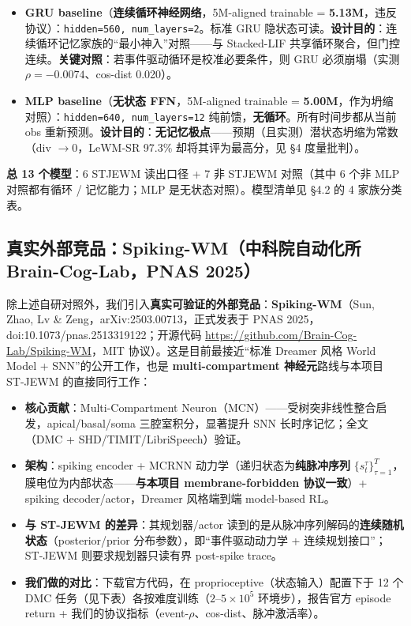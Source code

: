 \documentclass[11pt,a4paper]{article}
\begin{document}
\begin{itemize}[leftmargin=2em]
    \item \textbf{GRU baseline}（\textbf{连续循环神经网络}，5M-aligned trainable = \textbf{5.13M}，违反协议）：\texttt{hidden=560, num\_layers=2}。标准 GRU 隐状态可读。\textbf{设计目的}：连续循环记忆家族的“最小神入”对照——与 Stacked-LIF 共享循环聚合，但门控连续。\textbf{关键对照}：若事件驱动循环是校准必要条件，则 GRU 必须崩塌（实测 $\rho=-0.0074$、cos-dist 0.020）。
    \item \textbf{MLP baseline}（\textbf{无状态 FFN}，5M-aligned trainable = \textbf{5.00M}，作为坍缩对照）：\texttt{hidden=640, num\_layers=12} 纯前馈，\textbf{无循环}。所有时间步都从当前 obs 重新预测。\textbf{设计目的}：\textbf{无记忆极点}——预期（且实测）潜状态坍缩为常数（div $\to 0$，LeWM-SR 97.3\% 却将其评为最高分，见 §4 度量批判）。
\end{itemize}

\textbf{总 13 个模型}：6 STJEWM 读出口径 + 7 非 STJEWM 对照（其中 6 个非 MLP 对照都有循环 / 记忆能力；MLP 是无状态对照）。模型清单见 §4.2 的 4 家族分类表。

\subsection{真实外部竞品：Spiking-WM（中科院自动化所 Brain-Cog-Lab，PNAS 2025）}

除上述自研对照外，我们引入\textbf{真实可验证的外部竞品}：\textbf{Spiking-WM}（Sun, Zhao, Lv \& Zeng，arXiv:2503.00713，正式发表于 PNAS 2025，doi:10.1073/pnas.2513319122；开源代码 \url{https://github.com/Brain-Cog-Lab/Spiking-WM}，MIT 协议）。这是目前最接近“标准 Dreamer 风格 World Model + SNN”的公开工作，也是 \textbf{multi-compartment 神经元}路线与本项目 ST-JEWM 的直接同行工作：

\begin{itemize}[leftmargin=2em]
    \item \textbf{核心贡献}：Multi-Compartment Neuron（MCN）——受树突非线性整合启发，apical/basal/soma 三腔室积分，显著提升 SNN 长时序记忆；全文（DMC + SHD/TIMIT/LibriSpeech）验证。
    \item \textbf{架构}：spiking encoder + MCRNN 动力学（递归状态为\textbf{纯脉冲序列} $\{s^{\tau}_t\}_{\tau=1}^{T}$，膜电位为内部状态——\textbf{与本项目 membrane-forbidden 协议一致}）+ spiking decoder/actor，Dreamer 风格端到端 model-based RL。
    \item \textbf{与 ST-JEWM 的差异}：其规划器/actor 读到的是从脉冲序列解码的\textbf{连续随机状态}（posterior/prior 分布参数），即“事件驱动动力学 + 连续规划接口”；ST-JEWM 则要求规划器只读有界 post-spike trace。
    \item \textbf{我们做的对比}：下载官方代码，在 proprioceptive（状态输入）配置下于 12 个 DMC 任务（见下表）各按难度训练（$2$--$5\times10^5$ 环境步），报告官方 episode return + 我们的协议指标（event-$\rho$、cos-dist、脉冲激活率）。
\end{itemize}
\end{document}
